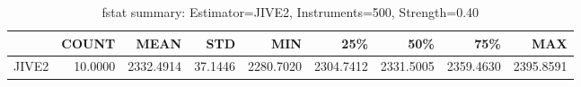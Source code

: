 \begin{table}[ht]
\centering
\caption{fstat summary: Estimator=JIVE2, Instruments=500, Strength=0.40}
\begin{tabular}{lrrrrrrrr}
\toprule
 & COUNT & MEAN & STD & MIN & 25\% & 50\% & 75\% & MAX \\
\midrule
JIVE2 & 10.0000 & 2332.4914 & 37.1446 & 2280.7020 & 2304.7412 & 2331.5005 & 2359.4630 & 2395.8591 \\
\bottomrule
\end{tabular}
\end{table}
